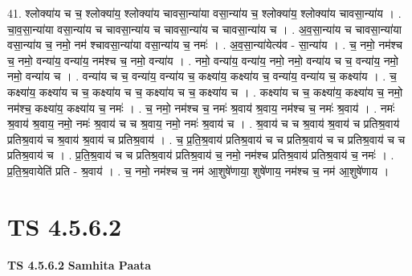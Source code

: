 \documentclass[17pt]{extarticle}
\begin{document}
41. श्लोक्या॑य च च॒ श्लोक्या॑य॒ श्लोक्या॑य चावसा॒न्या॑या वसा॒न्या॑य च॒ श्लोक्या॑य॒ श्लोक्या॑य चावसा॒न्या॑य । . चा॒व॒सा॒न्या॑या वसा॒न्या॑य च चावसा॒न्या॑य च चावसा॒न्या॑य च चावसा॒न्या॑य च । . अ॒व॒सा॒न्या॑य च चावसा॒न्या॑या वसा॒न्या॑य च॒ नमो॒ नम॑ श्चावसा॒न्या॑या वसा॒न्या॑य च॒ नमः॑ । . अ॒व॒सा॒न्या॑येत्य॑व - सा॒न्या॑य । . च॒ नमो॒ नम॑श्च च॒ नमो॒ वन्या॑य॒ वन्या॑य॒ नम॑श्च च॒ नमो॒ वन्या॑य । . नमो॒ वन्या॑य॒ वन्या॑य॒ नमो॒ नमो॒ वन्या॑य च च॒ वन्या॑य॒ नमो॒ नमो॒ वन्या॑य च । . वन्या॑य च च॒ वन्या॑य॒ वन्या॑य च॒ कक्ष्या॑य॒ कक्ष्या॑य च॒ वन्या॑य॒ वन्या॑य च॒ कक्ष्या॑य । . च॒ कक्ष्या॑य॒ कक्ष्या॑य च च॒ कक्ष्या॑य च च॒ कक्ष्या॑य च च॒ कक्ष्या॑य च । . कक्ष्या॑य च च॒ कक्ष्या॑य॒ कक्ष्या॑य च॒ नमो॒ नम॑श्च॒ कक्ष्या॑य॒ कक्ष्या॑य च॒ नमः॑ । . च॒ नमो॒ नम॑श्च च॒ नमः॑ श्र॒वाय॑ श्र॒वाय॒ नम॑श्च च॒ नमः॑ श्र॒वाय॑ । . नमः॑ श्र॒वाय॑ श्र॒वाय॒ नमो॒ नमः॑ श्र॒वाय॑ च च श्र॒वाय॒ नमो॒ नमः॑ श्र॒वाय॑ च । . श्र॒वाय॑ च च श्र॒वाय॑ श्र॒वाय॑ च प्रतिश्र॒वाय॑ प्रतिश्र॒वाय॑ च श्र॒वाय॑ श्र॒वाय॑ च प्रतिश्र॒वाय॑ । . च॒ प्र॒ति॒श्र॒वाय॑ प्रतिश्र॒वाय॑ च च प्रतिश्र॒वाय॑ च च प्रतिश्र॒वाय॑ च च प्रतिश्र॒वाय॑ च । . प्र॒ति॒श्र॒वाय॑ च च प्रतिश्र॒वाय॑ प्रतिश्र॒वाय॑ च॒ नमो॒ नम॑श्च प्रतिश्र॒वाय॑ प्रतिश्र॒वाय॑ च॒ नमः॑ । . प्र॒ति॒श्र॒वायेति॑ प्रति - श्र॒वाय॑ । . च॒ नमो॒ नम॑श्च च॒ नम॑ आ॒शुषे॑णाया॒ शुषे॑णाय॒ नम॑श्च च॒ नम॑ आ॒शुषे॑णाय । \newline
\pagebreak
{}

\section{ TS 4.5.6.2 }

\textbf{TS 4.5.6.2 } \newline
\textbf{Samhita Paata} \newline
\end{document}

